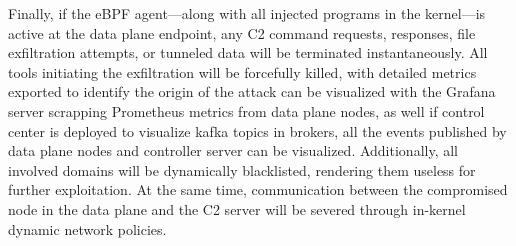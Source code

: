 \documentclass [11pt, proquest] {uwthesis}[2020/02/24]
\begin{document}
Finally, if the eBPF agent—along with all injected programs in the kernel—is active at the data plane endpoint, any C2 command requests, responses, file exfiltration attempts, or tunneled data will be terminated instantaneously. All tools initiating the exfiltration will be forcefully killed, with detailed metrics exported to identify the origin of the attack can be visualized with the Grafana server scrapping Prometheus metrics from data plane nodes, as well if control center is deployed to visualize kafka topics in brokers, all the events published by data plane nodes and controller server can be visualized. Additionally, all involved domains will be dynamically blacklisted, rendering them useless for further exploitation. At the same time, communication between the compromised node in the data plane and the C2 server will be severed through in-kernel dynamic network policies.


\end{document}
